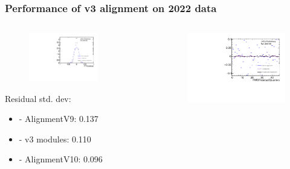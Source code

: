 \documentclass[aspectratio=1610, 12pt, xcolor=dvipsnames]{beamer}
\begin{document}
\begin{frame}\frametitle{Performance of v3 alignment on 2022 data}
  \begin{columns}
    \begin{column}[c]{0.49\textwidth}
      \begin{figure}
        \includegraphics[width=0.7\textwidth]{plots/FTResidual_moore.pdf}
      \end{figure}
      Residual std. dev:
      \begin{itemize}
        \item - AlignmentV9: 0.137
        \item - v3 modules: 0.110
        \item - AlignmentV10: 0.096
      \end{itemize}
    \end{column}
    \begin{column}[c]{0.51\textwidth}
      \begin{figure}
        \includegraphics[width=\textwidth]{plots/RMSResidual_moore.pdf}
      \end{figure}
    \end{column}
  \end{columns}  
\end{frame}
\end{document}
